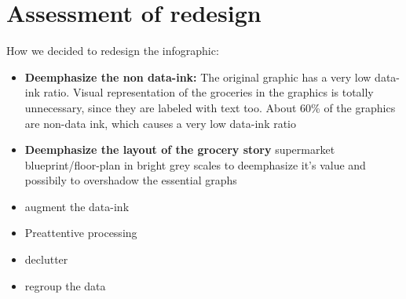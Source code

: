 \section{Assessment of redesign}

How we decided to redesign the infographic:

\begin{itemize}
	\item \textbf{Deemphasize the non data-ink:} The original graphic has a very low data-ink ratio. Visual representation of the groceries in the graphics is totally unnecessary, since they are labeled with text too. About 60\% of the graphics are non-data ink, which causes a very low data-ink ratio 
    \item \textbf{Deemphasize the layout of the grocery story} supermarket blueprint/floor-plan in bright grey scales to deemphasize
		it's value and possibily to overshadow the essential graphs
	\item augment the data-ink
    \item Preattentive processing
	\item declutter
	\item regroup the data
\end{itemize}


